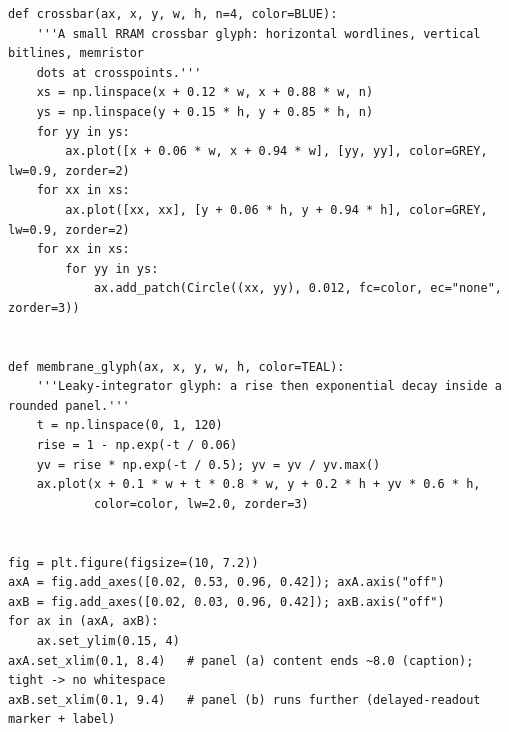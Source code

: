 \begin{lstlisting}[caption={experiments/temporal\_storerecall.ipynb},label={lst:mnn-nb-temporal-storerecall}]
def crossbar(ax, x, y, w, h, n=4, color=BLUE):
    '''A small RRAM crossbar glyph: horizontal wordlines, vertical bitlines, memristor
    dots at crosspoints.'''
    xs = np.linspace(x + 0.12 * w, x + 0.88 * w, n)
    ys = np.linspace(y + 0.15 * h, y + 0.85 * h, n)
    for yy in ys:
        ax.plot([x + 0.06 * w, x + 0.94 * w], [yy, yy], color=GREY, lw=0.9, zorder=2)
    for xx in xs:
        ax.plot([xx, xx], [y + 0.06 * h, y + 0.94 * h], color=GREY, lw=0.9, zorder=2)
    for xx in xs:
        for yy in ys:
            ax.add_patch(Circle((xx, yy), 0.012, fc=color, ec="none", zorder=3))


def membrane_glyph(ax, x, y, w, h, color=TEAL):
    '''Leaky-integrator glyph: a rise then exponential decay inside a rounded panel.'''
    t = np.linspace(0, 1, 120)
    rise = 1 - np.exp(-t / 0.06)
    yv = rise * np.exp(-t / 0.5); yv = yv / yv.max()
    ax.plot(x + 0.1 * w + t * 0.8 * w, y + 0.2 * h + yv * 0.6 * h,
            color=color, lw=2.0, zorder=3)


fig = plt.figure(figsize=(10, 7.2))
axA = fig.add_axes([0.02, 0.53, 0.96, 0.42]); axA.axis("off")
axB = fig.add_axes([0.02, 0.03, 0.96, 0.42]); axB.axis("off")
for ax in (axA, axB):
    ax.set_ylim(0.15, 4)
axA.set_xlim(0.1, 8.4)   # panel (a) content ends ~8.0 (caption); tight -> no whitespace
axB.set_xlim(0.1, 9.4)   # panel (b) runs further (delayed-readout marker + label)


\end{lstlisting}
